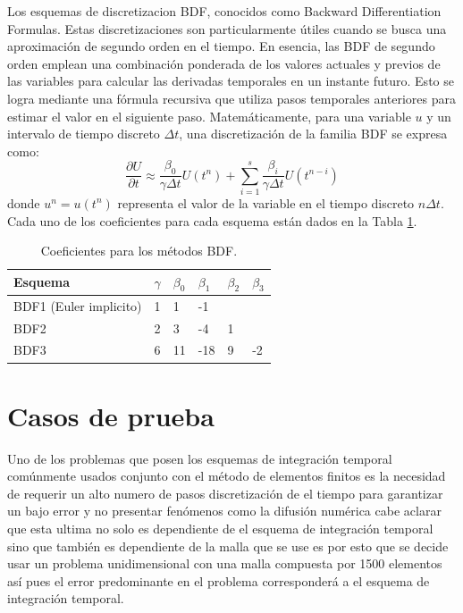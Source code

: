 \documentclass[11pt, spanish]{article}
\begin{document}
Los esquemas de discretizacion  BDF, conocidos como Backward Differentiation Formulas. Estas discretizaciones son particularmente \'utiles cuando se busca una aproximaci\'on de segundo orden en el tiempo. En esencia, las BDF de segundo orden emplean una combinaci\'on ponderada de los valores actuales y previos de las variables para calcular las derivadas temporales en un instante futuro. Esto se logra mediante una f\'ormula recursiva que utiliza pasos temporales anteriores para estimar el valor en el siguiente paso. Matem\'aticamente, para una variable $u$ y un intervalo de tiempo discreto $\Delta t$, una discretizaci\'on de la familia BDF se expresa como:
\begin{equation}
	\frac{\partial U}{\partial t} \approx \frac{\beta_0}{\gamma \Delta t} U(t^n) + \sum_{i = 1}^{s} \frac{\beta_i}{\gamma \Delta t} U (t^{n-i}) 
\end{equation}
donde $u^n = u(t^n)$ representa el valor de la variable en el tiempo discreto $n\Delta t$.
Cada uno de los coeficientes para cada esquema est\'an dados en la Tabla \ref{tabla2}.

\begin{table}[!h]
	\label{tabla2}
	\caption{Coeficientes para los m\'etodos BDF.}
	\centering
	\begin{tabular}{@{}llllll@{}}
		\toprule
		Esquema                & $\gamma$ & $\beta_0$ & $\beta_1$ & $\beta_2$ & $\beta_3$ \\ \midrule
		BDF1 (Euler implicito) & 1     & 1       & -1      &         &         \\
		BDF2                   & 2     & 3       & -4      & 1       &         \\
		BDF3                   & 6     & 11      & -18     & 9       & -2      \\ \bottomrule
	\end{tabular}
\end{table}
\section{Casos de prueba}
Uno de los problemas que posen los esquemas de integraci\'on temporal com\'unmente usados conjunto con el m\'etodo de elementos finitos es la necesidad de requerir un alto numero de pasos discretización de el tiempo para garantizar un bajo error y no presentar fen\'omenos como la difusi\'on num\'erica cabe aclarar que esta ultima no solo es dependiente de el esquema de integraci\'on temporal sino que tambi\'en es dependiente de la malla que se use es por esto que se decide usar un problema unidimensional con una malla compuesta por 1500 elementos  as\'i pues el error predominante en el problema corresponder\'a a el esquema de integraci\'on temporal. 
\end{document}
